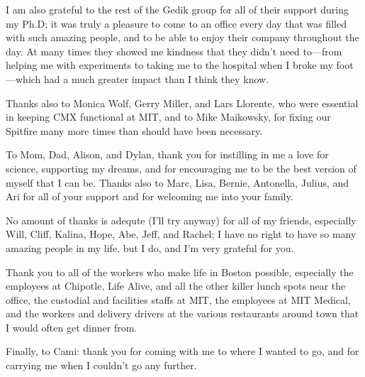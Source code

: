 I am also grateful to the rest of the Gedik group for all of their support during my Ph.D; it was truly a pleasure to come to an office every day that was filled with such amazing people, and to be able to enjoy their company throughout the day.
At many times they showed me kindness that they didn't need to---from helping me with experiments to taking me to the hospital when I broke my foot---which had a much greater impact than I think they know.

Thanks also to Monica Wolf, Gerry Miller, and Lars Llorente, who were essential in keeping CMX functional at MIT, and to Mike Maikowsky, for fixing our Spitfire many more times than should have been necessary.

To Mom, Dad, Alison, and Dylan, thank you for instilling in me a love for science, supporting my dreams, and for encouraging me to be the best version of myself that I can be.
Thanks also to Marc, Lisa, Bernie, Antonella, Julius, and Ari for all of your support and for welcoming me into your family.

No amount of thanks is adequte (I'll try anyway) for all of my friends, especially Will, Cliff, Kalina, Hope, Abe, Jeff, and Rachel; I have no right to have so many amazing people in my life, but I do, and I'm very grateful for you.

Thank you to all of the workers who make life in Boston possible, especially the employees at Chipotle, Life Alive, and all the other killer lunch spots near the office, the custodial and facilities staffs at MIT, the employees at MIT Medical, and the workers and delivery drivers at the various restaurants around town that I would often get dinner from.

Finally, to Cami: thank you for coming with me to where I wanted to go, and for carrying me when I couldn't go any further.
